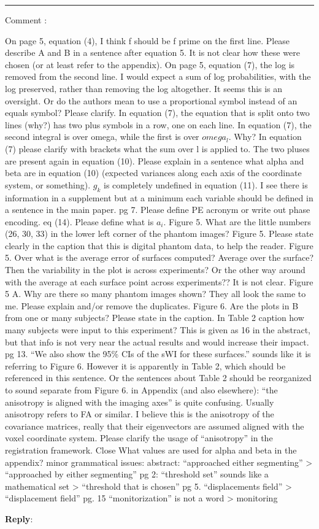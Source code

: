 \documentclass[9pt]{memoir}
\newcounter{reviewpoint}
\newenvironment{reviewpoint}%
{\refstepcounter{reviewpoint}\par\medskip\vspace{3ex}\hrule\vspace{1.5ex}\par\noindent%
   {\fontseries{b}\selectfont Comment \arabic{reviewpoint}:}
   \begingroup%
   \color{black!60}
   \fontshape{it}\selectfont %

}
{\endgroup\label{com:\thereviewpoint}\par\medskip}
\newcommand{\reply}{\par\fontshape{n}\selectfont \noindent \textbf{Reply}:\ }
\begin{document}
\begin{reviewpoint}
On page 5, equation (4), I think f should be f prime on the first line.
Please describe A and B in a sentence after equation 5. It is not clear how these were chosen (or at least refer to the appendix).
On page 5, equation (7), the ­log is removed from the second line. I would expect a sum of log probabilities, with the log preserved, rather than removing the log altogether. It seems this is an oversight. Or do the authors mean to use a proportional symbol instead of an equals symbol? Please clarify.
In equation (7), the equation that is split onto two lines (why?) has two plus symbols in a row, one on each line. In equation (7), the second integral is over omega, while the first is over $omega_l$. Why?
In equation (7) please clarify with brackets what the sum over l is applied to.
The two pluses are present again in equation (10).
Please explain in a sentence what alpha and beta are in equation (10) (expected variances along each axis of the coordinate system, or something).
$g_k$ is completely undefined in equation (11). I see there is information in a supplement but at a minimum each variable should be defined in a sentence in the main paper.
pg 7. Please define PE acronym or write out phase encoding.
eq (14). Please define what is $a_i$.
Figure 5. What are the little numbers (26, 30, 33) in the lower left corner of the phantom images? Figure 5. Please state clearly in the caption that this is digital phantom data, to help the reader.
Figure 5. Over what is the average error of surfaces computed? Average over the surface? Then the variability in the plot is across experiments? Or the other way around with the average at each surface point across experiments?? It is not clear.
Figure 5 A. Why are there so many phantom images shown? They all look the same to me. Please explain and/or remove the duplicates.
Figure 6. Are the plots in B from one or many subjects? Please state in the caption.
In Table 2 caption how many subjects were input to this experiment? This is given as 16 in the abstract, but that info is not very near the actual results and would increase their impact.
pg 13. ``We also show the 95\% CIs of the sWI for these surfaces.'' sounds like it is referring to Figure 6. However it is apparently in Table 2, which should be referenced in this sentence. Or the sentences about Table 2 should be reorganized to sound separate from Figure 6.
in Appendix (and also elsewhere): ``the anisotropy is aligned with the imaging axes'' is quite confusing. Usually anisotropy refers to FA or similar. I believe this is the anisotropy of the covariance matrices, really that their eigenvectors are assumed aligned with the voxel coordinate system. Please clarify the usage of ``anisotropy'' in the registration framework.
Close
What values are used for alpha and beta in the appendix?
minor grammatical issues:
abstract: ``approached either segmenting'' ­> ``approached by either segmenting'' pg 2: ``threshold set'' sounds like a mathematical set ­> ``threshold that is chosen'' pg 5. ``displacements field'' ­> ``displacement field''
pg. 15 ``monitorization'' is not a word ­> monitoring

\end{reviewpoint}
\reply{%
}



\end{document}
